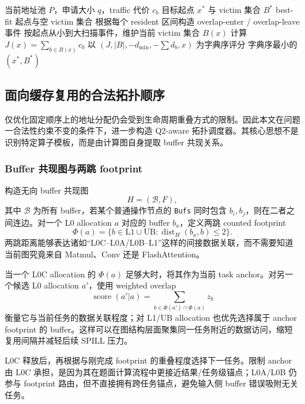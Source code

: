 \begin{algorithm}[H]
\caption{连续地址不足时的最小 traffic 窗口选择}
\label{alg:q2-window}
\begin{algorithmic}[1]
\Require 当前地址池 $P$，申请大小 $q$，traffic 代价 $c_b$
\Ensure 目标起点 $x^*$ 与 victim 集合 $B^*$
    \State \Return best-fit 起点与空 victim 集合
\EndIf
\State 根据每个 resident 区间构造 overlap-enter / overlap-leave 事件
\State 按起点从小到大扫描事件，维护当前 victim 集合 $B(x)$
    \State 计算 $J(x)=\sum_{b\in B(x)}c_b$
    \State 以 $(J,|B|,-d_{\min},-\sum d_b,x)$ 为字典序评分
\EndFor
\State \Return 字典序最小的 $(x^*,B^*)$
\end{algorithmic}
\end{algorithm}

\subsection{面向缓存复用的合法拓扑顺序}

仅优化固定顺序上的地址分配仍会受到生命周期重叠方式的限制。因此本文在问题一合法性约束不变的条件下，进一步构造 Q2-aware 拓扑调度器。其核心思想不是识别特定算子模板，而是由计算图自身提取 buffer 共现关系。

\subsubsection{Buffer 共现图与两跳 footprint}

构造无向 buffer 共现图
\[
H=(\mathcal B,F),
\]
其中 $\mathcal B$ 为所有 buffer，若某个普通操作节点的 \texttt{Bufs} 同时包含 $b_i,b_j$，则在二者之间连边。对一个 L0 allocation $a$ 对应的 buffer $b_a$，定义两跳 counted footprint
\[
\Phi(a)=\{b\in \mathrm{L1}\cup\mathrm{UB}:\operatorname{dist}_{H}(b_a,b)\le 2\}.
\]
两跳距离能够表达诸如“L0C--L0A/L0B--L1”这样的间接数据关联，而不需要知道当前图究竟来自 Matmul、Conv 还是 FlashAttention。

当一个 L0C allocation 的 $\Phi(a)$ 足够大时，将其作为当前 task anchor。对另一个候选 L0 allocation $a'$，使用 weighted overlap
\[
\operatorname{score}(a'|a)=\sum_{b\in \Phi(a')\cap\Phi(a)} z_b
\]
衡量它与当前任务的数据关联程度；对 L1/UB allocation 也优先选择属于 anchor footprint 的 buffer。这样可以在图结构层面聚集同一任务附近的数据访问，缩短复用间隔并减轻后续 SPILL 压力。

L0C 释放后，再根据与刚完成 footprint 的重叠程度选择下一任务。限制 anchor 由 L0C 承担，是因为其在题面计算流程中更接近结果/任务级锚点；L0A/L0B 仍参与 footprint 路由，但不直接拥有跨任务锚点，避免输入侧 buffer 错误吸附无关任务。

